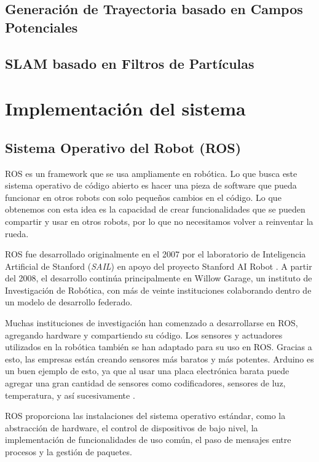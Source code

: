 \subsection{Generaci\'on de Trayectoria basado en Campos Potenciales}

\subsection{SLAM basado en Filtros de Part\'iculas}

\section{Implementaci\'on del sistema}

\subsection{Sistema Operativo del Robot (ROS)}
ROS es un framework que se usa ampliamente en rob\'otica. Lo que busca 
este sistema operativo de código abierto es hacer una pieza de software 
que pueda funcionar en otros robots con solo pequeños cambios en el 
c\'odigo. Lo que obtenemos con esta idea es la capacidad de crear 
funcionalidades que se pueden compartir y usar en otros robots, por 
lo que no necesitamos volver a reinventar la rueda.

ROS fue desarrollado originalmente en el 2007 por el laboratorio de 
Inteligencia Artificial de Stanford (\textit{SAIL}) en apoyo del proyecto 
Stanford AI Robot \cite{rosHistory}. A partir del 2008, el desarrollo 
contin\'ua principalmente en Willow Garage, un instituto de Investigaci\'on 
de Rob\'otica, con m\'as de veinte instituciones colaborando dentro de un 
modelo de desarrollo federado.

Muchas instituciones de investigaci\'on han comenzado a desarrollarse en 
ROS, agregando hardware y compartiendo su c\'odigo. Los sensores y actuadores 
utilizados en la rob\'otica tambi\'en se han adaptado para su uso en ROS. Gracias 
a esto, las empresas est\'an creando sensores m\'as baratos y m\'as potentes. Arduino 
es un buen ejemplo de esto, ya que al usar una placa electr\'onica barata puede 
agregar una gran cantidad de sensores como codificadores, sensores de luz, 
temperatura, y as\'i sucesivamente \cite{rosIntroduction}.

ROS proporciona las instalaciones del sistema operativo est\'andar, como 
la abstracci\'on de hardware, el control de dispositivos de bajo nivel, la 
implementaci\'on de funcionalidades de uso com\'un, el paso de mensajes entre 
procesos y la gesti\'on de paquetes. %

